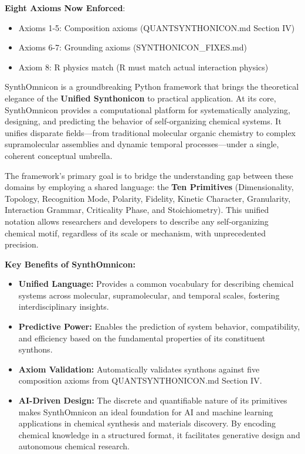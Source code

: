 \documentclass[12pt,a4paper]{article}
\begin{document}
\textbf{Eight Axioms Now Enforced}:

\begin{itemize}
    \item Axioms 1-5: Composition axioms (QUANTSYNTHONICON.md Section IV)
    \item Axioms 6-7: Grounding axioms (SYNTHONICON\_FIXES.md)
    \item Axiom 8: R physics match (R must match actual interaction physics)
\end{itemize}

SynthOmnicon is a groundbreaking Python framework that brings the theoretical elegance of the \textbf{Unified Synthonicon} to practical application. At its core, SynthOmnicon provides a computational platform for systematically analyzing, designing, and predicting the behavior of self-organizing chemical systems. It unifies disparate fields---from traditional molecular organic chemistry to complex supramolecular assemblies and dynamic temporal processes---under a single, coherent conceptual umbrella.

The framework's primary goal is to bridge the understanding gap between these domains by employing a shared language: the \textbf{Ten Primitives} (Dimensionality, Topology, Recognition Mode, Polarity, Fidelity, Kinetic Character, Granularity, Interaction Grammar, Criticality Phase, and Stoichiometry). This unified notation allows researchers and developers to describe any self-organizing chemical motif, regardless of its scale or mechanism, with unprecedented precision.

\textbf{Key Benefits of SynthOmnicon:}

\begin{itemize}
    \item \textbf{Unified Language:} Provides a common vocabulary for describing chemical systems across molecular, supramolecular, and temporal scales, fostering interdisciplinary insights.
    \item \textbf{Predictive Power:} Enables the prediction of system behavior, compatibility, and efficiency based on the fundamental properties of its constituent synthons.
    \item \textbf{Axiom Validation:} Automatically validates synthons against five composition axioms from QUANTSYNTHONICON.md Section IV.
    \item \textbf{AI-Driven Design:} The discrete and quantifiable nature of its primitives makes SynthOmnicon an ideal foundation for AI and machine learning applications in chemical synthesis and materials discovery. By encoding chemical knowledge in a structured format, it facilitates generative design and autonomous chemical research.
\end{itemize}
\end{document}
